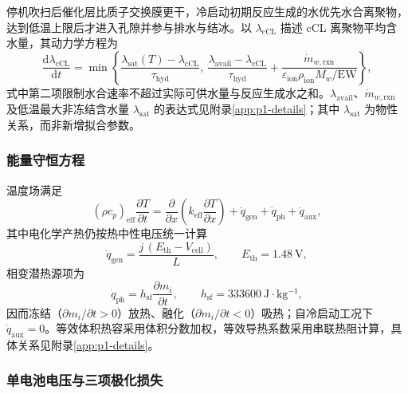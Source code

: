 \documentclass{gmcmthesis}
\begin{document}
停机吹扫后催化层比质子交换膜更干，冷启动初期反应生成的水优先水合离聚物，达到低温上限后才进入孔隙并参与排水与结冰。以 $\lambda_{\mathrm{cCL}}$ 描述 cCL 离聚物平均含水量，其动力学方程为
\begin{equation}
  \frac{\mathrm{d}\lambda_{\mathrm{cCL}}}{\mathrm{d}t}
  =\min\!\left\{
    \frac{\lambda_{\mathrm{sat}}(T)-\lambda_{\mathrm{cCL}}}{\tau_{\mathrm{hyd}}},~
    \frac{\lambda_{\mathrm{avail}}-\lambda_{\mathrm{cCL}}}{\tau_{\mathrm{hyd}}}
    +\frac{\dot{m}_{w,\mathrm{rxn}}}{\varepsilon_{\mathrm{ion}}\rho_{\mathrm{ion}}M_w/\mathrm{EW}}
  \right\},
  \label{eq:hyd}
\end{equation}
式中第二项限制水合速率不超过实际可供水量与反应生成水之和。$\lambda_{\mathrm{avail}}$、$\dot m_{w,\mathrm{rxn}}$ 及低温最大非冻结含水量 $\lambda_{\mathrm{sat}}$ 的表达式见附录\ref{app:p1-details}；其中 $\lambda_{\mathrm{sat}}$ 为物性关系，而非新增拟合参数。

\subsubsection{能量守恒方程}

温度场满足
\begin{equation}
  (\rho c_p)_{\mathrm{eff}}\frac{\partial T}{\partial t}
  =\frac{\partial}{\partial x}\!\left(k_{\mathrm{eff}}\frac{\partial T}{\partial x}\right)
  +\dot q_{\mathrm{gen}}+\dot q_{\mathrm{ph}}+\dot q_{\mathrm{aux}},
  \label{eq:energy}
\end{equation}
其中电化学产热仍按热中性电压统一计算
\begin{equation}
  \dot q_{\mathrm{gen}}=\frac{j\,(E_{\mathrm{th}}-V_{\mathrm{cell}})}{L},
  \qquad E_{\mathrm{th}}=1.48~\mathrm{V},
  \label{eq:qgen}
\end{equation}
相变潜热源项为
\begin{equation}
  \dot q_{\mathrm{ph}}=h_{\mathrm{sf}}\frac{\partial m_i}{\partial t},
  \qquad h_{\mathrm{sf}}=333600~\mathrm{J\cdot kg^{-1}},
  \label{eq:qph}
\end{equation}
因而冻结（$\partial m_i/\partial t>0$）放热、融化（$\partial m_i/\partial t<0$）吸热；自冷启动工况下 $\dot q_{\mathrm{aux}}=0$。等效体积热容采用体积分数加权，等效导热系数采用串联热阻计算，具体关系见附录\ref{app:p1-details}。

\subsubsection{单电池电压与三项极化损失}
\end{document}
